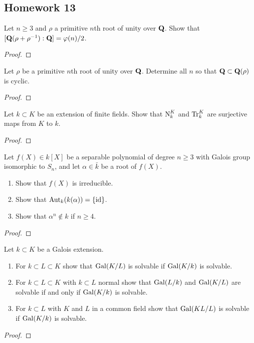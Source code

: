 \subsection{Homework 13}
\begin{problem}
Let $n\geq 3$ and $\rho$ a primitive $n$th root of unity over $\mathbf{Q}$. Show
that $[\mathbf{Q}(\rho+\rho^{-1}):\mathbf{Q}]=\varphi(n)/2$.
\end{problem}
\begin{proof}
\end{proof}

\begin{problem}
Let $\rho$ be a primitive $n$th root of unity over $\mathbf{Q}$. Determine all
$n$ so that $\mathbf{Q}\subset\mathbf{Q}(\rho)$ is cyclic.
\end{problem}
\begin{proof}
\end{proof}

\begin{problem}
Let $k\subset K$ be an extension of finite fields. Show that $\operatorname{N}_k^K$ and
$\operatorname{Tr}_k^K$ are surjective maps from $K$ to $k$.
\end{problem}
\begin{proof}
\end{proof}

\begin{problem}
Let $f(X)\in k[X]$ be a separable polynomial of degree $n\geq 3$ with
Galois group isomorphic to $S_n$, and let $\alpha\in\bar k$ be a root of
$f(X)$.
\begin{enumerate}[label=(\alph*),noitemsep]
\item Show that $f(X)$ is irreducible.
\item Show that $\operatorname{Aut}_k(k(\alpha))=\{\operatorname{id}\}$.
\item Show that $\alpha^n\notin k$ if $n\geq 4$.
\end{enumerate}
\end{problem}
\begin{proof}
\end{proof}

\begin{problem}
Let $k\subset K$ be a Galois extension.
\begin{enumerate}[label=(\alph*),noitemsep]
\item For $k\subset L\subset K$ show that $\operatorname{Gal}(K/L)$ is solvable if
  $\operatorname{Gal}(K/k)$ is solvable.
\item For $k\subset L\subset K$ with $k\subset L$ normal show that
  $\operatorname{Gal}(L/k)$ and $\operatorname{Gal}(K/L)$ are solvable if and only if $\operatorname{Gal}(K/k)$ is
  solvable.
\item For $k\subset L$ with $K$ and $L$ in a common field show that
  $\operatorname{Gal}(KL/L)$ is solvable if $\operatorname{Gal}(K/k)$ is solvable.
\end{enumerate}
\end{problem}
\begin{proof}
\end{proof}

